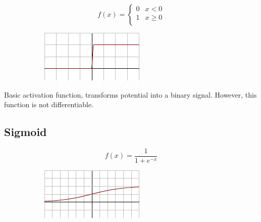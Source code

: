 \begin{figure}[H]
\raggedright
\begin{subfigure}{.35\textwidth}
  \centering
   \[
f(x) = \begin{cases}
       0 & x < 0 \\
       1 & x \geq 0 \\
     \end{cases} \]
\end{subfigure}%
\begin{subfigure}{.25\textwidth}
  \centering
  \includegraphics[width=\textwidth]{tex/images/activation/binstep}
\end{subfigure}
\end{figure}

\noindent
Basic activation function, transforms potential into a binary signal. However, this function is not differentiable.
      
\subsection*{Sigmoid}

\begin{figure}[H]
\raggedright
\begin{subfigure}{.28\textwidth}
  \centering
  \[ f(x) = \frac{1}{1 + e^{-x}} \]
\end{subfigure}%
\begin{subfigure}{.25\textwidth}
  \centering
  \includegraphics[width=\textwidth]{tex/images/activation/sigmoid}
\end{subfigure}
\end{figure}

